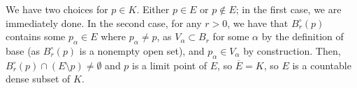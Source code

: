 \documentclass[12pt,letterpaper]{article}
\theoremstyle{definition}
\begin{document}
We have two choices for $p \in K$. Either $p \in E$ or $p \notin E$; in the first case, we are immediately done. In the second case, for any $r > 0$, we have that $B_{r}^{\circ}(p)$ contains some $p_{\alpha} \in E$ where $p_{\alpha} \neq p$, as $V_{\alpha} \subset B_{r}$ for some $\alpha$ by the definition of base (as $B_{r}^{\circ}(p)$ is a nonempty open set), and $p_{\alpha} \in V_{\alpha}$ by construction. Then, $B_{r}^{\circ}(p) \cap (E \setminus{p}) \neq \emptyset$ and $p$ is a limit point of $E$, so $\overline{E} = K$, so $E$ is a countable dense subset of $K$.
\end{document}
